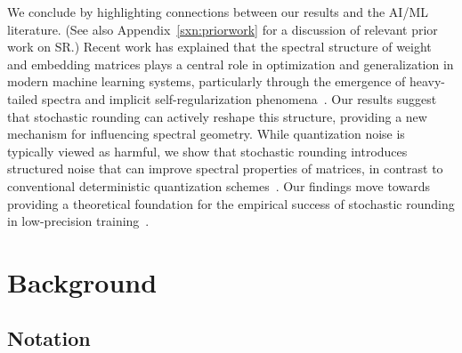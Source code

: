 \documentclass{article}
\begin{document}
We conclude by highlighting connections between our results and the AI/ML literature. (See also Appendix~\ref{sxn:priorwork} for a discussion of relevant prior work on SR.) Recent work has explained that the spectral structure of weight and embedding matrices plays a central role in optimization and generalization in modern machine learning systems, particularly through the emergence of heavy-tailed spectra and implicit self-regularization phenomena~\citep{mahoney2019traditional,martin2021implicit,martin2021predicting}. Our results suggest that stochastic rounding can actively reshape this structure, providing a new mechanism for influencing spectral geometry. While quantization noise is typically viewed as harmful, we show that stochastic rounding introduces structured noise that can improve spectral properties of matrices, in contrast to conventional deterministic quantization schemes~\citep{gholami2022survey,jin2024comprehensive}. Our findings move towards providing a theoretical foundation for the empirical success of stochastic rounding in low-precision training~\citep{ozkara2025stochastic,kwun2025lotion,zhaodirect}.

\section{Background}

\subsection{Notation}
\end{document}
